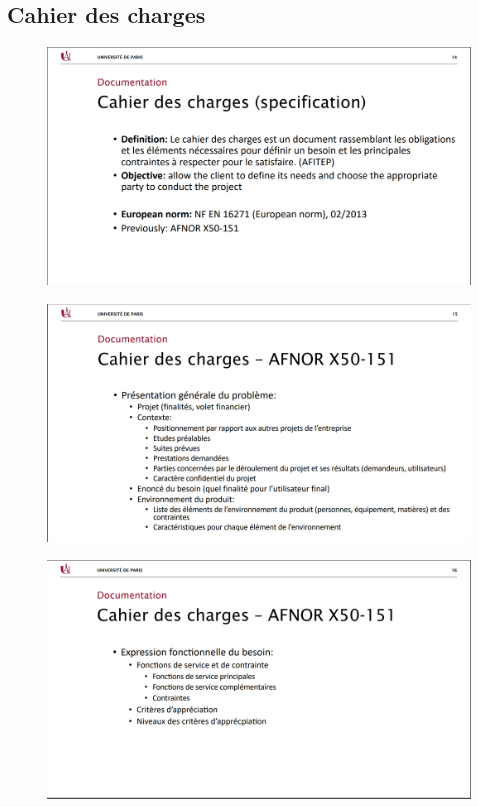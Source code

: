 \documentclass[12pt]{article}
\begin{document}
\subsection{Cahier des charges}
\newpage
	\begin{figure}[!hbtp]
	\centering
	\includegraphics[scale=0.75]{Capture.PNG}
\end{figure}
	\begin{figure}[!hbtp]
	\centering
	\includegraphics[scale=0.75]{Capture2.PNG}
\end{figure}
\newpage
\begin{figure}[!hbtp]
	\centering
	\includegraphics[scale=0.75]{Capture3.PNG}
\end{figure}
\end{document}
